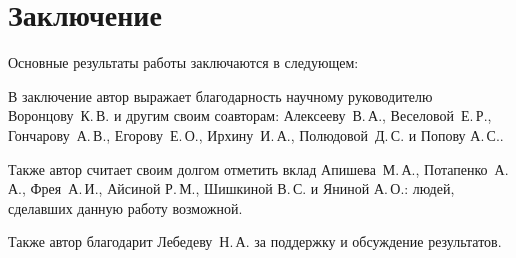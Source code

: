 \chapter*{Заключение}                       %


Основные результаты работы заключаются в следующем:


В заключение автор выражает благодарность научному руководителю Воронцову~К.\,В. и другим своим соавторам: Алексееву~В.\,А., Веселовой~Е.\,Р., Гончарову~А.\,В., Егорову~Е.\,О., Ирхину~И.\,А.,  Полюдовой~Д.\,С. и Попову А.\,С..

Также автор считает своим долгом отметить вклад Апишева~М.\,А., Потапенко~А.\,А., Фрея~А.\,И., Айсиной Р.\,М., Шишкиной В.\,С. и Яниной А.\,О.: людей, сделавших данную работу возможной.

Также автор благодарит Лебедеву~Н.\,А. за поддержку и обсуждение результатов.
